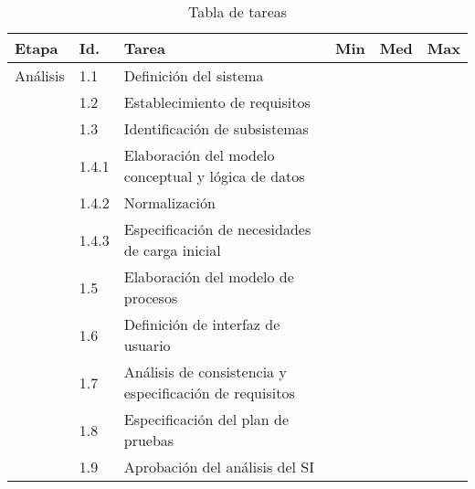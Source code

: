 \documentclass[11pt,a4paper,spanish,twoside]{report}
\begin{document}
\begin{table}[!h]
\centering
  \begin{tabular}{p{1.6cm}|p{1cm}|p{5cm}|p{1cm}|p{1cm}|p{1cm}}
    \textbf{Etapa} & \textbf{Id.} & \textbf{Tarea} & \textbf{Min} &
    \textbf{Med} & \textbf{Max}\\
    \hline \hline
    Análisis & 1.1 & Definición del sistema\\ 
    \cline{2-3}
    & 1.2 & Establecimiento de requisitos\\
    \cline{2-3}
    & 1.3 & Identificación de subsistemas\\
    \cline{2-3}
    & 1.4.1 & Elaboración del modelo conceptual y lógica de datos\\
    \cline{2-3}
    & 1.4.2 & Normalización\\
    \cline{2-3}
    & 1.4.3 & Especificación de necesidades de carga inicial\\
    \cline{2-3}
    & 1.5 & Elaboración del modelo de procesos\\
    \cline{2-3}
    & 1.6 & Definición de interfaz de usuario\\
    \cline{2-3}
    & 1.7 & Análisis de consistencia y especificación de requisitos\\
    \cline{2-3}
    & 1.8 & Especificación del plan de pruebas\\
    \cline{2-3}
    & 1.9 & Aprobación del análisis del SI\\
  \end{tabular}
  \caption{Tabla de tareas} \label{Tab:tareas1}
\end{table}
\end{document}
